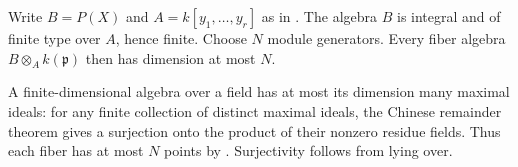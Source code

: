 Write $B=P(X)$ and $A=k[y_1,\ldots,y_r]$ as in . The algebra $B$ is integral and of finite type over $A$, hence finite. Choose $N$ module generators. Every fiber algebra $B\otimes_Ak(\mathfrak p)$ then has dimension at most $N$.

A finite-dimensional algebra over a field has at most its dimension many maximal ideals: for any finite collection of distinct maximal ideals, the Chinese remainder theorem gives a surjection onto the product of their nonzero residue fields. Thus each fiber has at most $N$ points by . Surjectivity follows from lying over.
